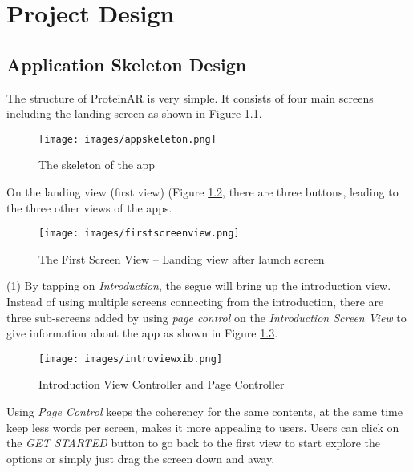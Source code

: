 \chapter{Project Design}
\label{ch:design}

\section{Application Skeleton Design}
The structure of ProteinAR is very simple. It consists of four main screens including the landing screen as shown in Figure \ref{fig:appskeleton}. 
\begin{figure}[!htp]
	\centering
	\texttt{[image: images/appskeleton.png]}
	\caption{The skeleton of the app}
	\label{fig:appskeleton}
\end{figure}

On the landing view (first view) (Figure \ref{fig:firstview}, there are three buttons, leading to the three other views of the apps. 
\begin{figure}[!htp]
	\centering
	\texttt{[image: images/firstscreenview.png]}
	\caption{The First Screen View – Landing view after launch screen}
	\label{fig:firstview}
\end{figure}

(1) By tapping on \emph{Introduction}, the segue will bring up the introduction view. Instead of using multiple screens connecting from the introduction, there are three sub-screens added by using \emph{page control} on the \emph{Introduction Screen View} to give information about the app as shown in Figure \ref{fig:introviewxib}.
\begin{figure}[!htp]
	\centering
	\texttt{[image: images/introviewxib.png]}
	\caption{Introduction View Controller and Page Controller}
	\label{fig:introviewxib}
\end{figure}
Using \emph{Page Control} keeps the coherency for the same contents, at the same time keep less words per screen, makes it more appealing to users. Users can click on the \emph{GET STARTED} button to go back to the first view to start explore the options or simply just drag the screen down and away.

